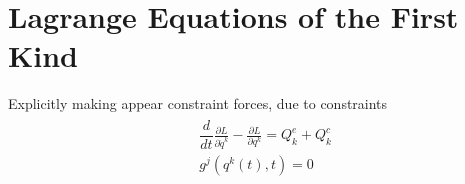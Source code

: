 \documentclass[letterpaper,10pt,english]{jupyterBook}
\begin{document}
\section{Lagrange Equations of the First Kind}
\label{\detokenize{ch/lagrange-i-type:lagrange-equations-of-the-first-kind}}\label{\detokenize{ch/lagrange-i-type:classical-mechanics-lagrange-ii-type}}\label{\detokenize{ch/lagrange-i-type::doc}}
\sphinxAtStartPar
Explicitly making appear constraint forces, due to constraints
\begin{equation*}
\begin{split}\begin{aligned}
 & \dfrac{d}{dt}\frac{\partial L}{\partial \dot{q}^k} - \frac{\partial L}{\partial q^k} = Q^e_k + Q^c_k \\
 & g^j \left(q^k(t), t\right) = 0
\end{aligned}\end{split}
\end{equation*}\label{ch/lagrange-i-type:example-0}
\end{document}

